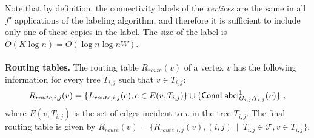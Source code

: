 Note that by definition, the connectivity labels of the \emph{vertices} are the same in all $f'$ applications of the labeling algorithm, and therefore it is sufficient to include only one of these copies in the label. The size of the label is $O(K\log{n})=O(\log{n} \log{nW})$.
%
%
\\ \\
\noindent \textbf{Routing tables.} The routing table $R_{route}(v)$ of a vertex $v$ has the following information for every tree 
$T_{i,j}$ such that $v \in T_{i,j}$:
\begin{equation}\label{eq:route-table-ij}
R_{route,i,j}(v)=\{L_{route,i,j}(e), e \in E(v,T_{i,j})\} \cup \{\mathsf{ConnLabel}^1_{G_{i,j},T_{i,j}}(v)\}~,
\end{equation}
where $E(v,T_{i,j})$ is the set of edges incident to $v$ in the tree $T_{i,j}$. 
The final routing table is given by $R_{route}(v)=\{R_{route,i,j}(v), (i,j) ~\mid~ T_{i,j} \in \mathcal{T}, v\in T_{i,j}\}$.

